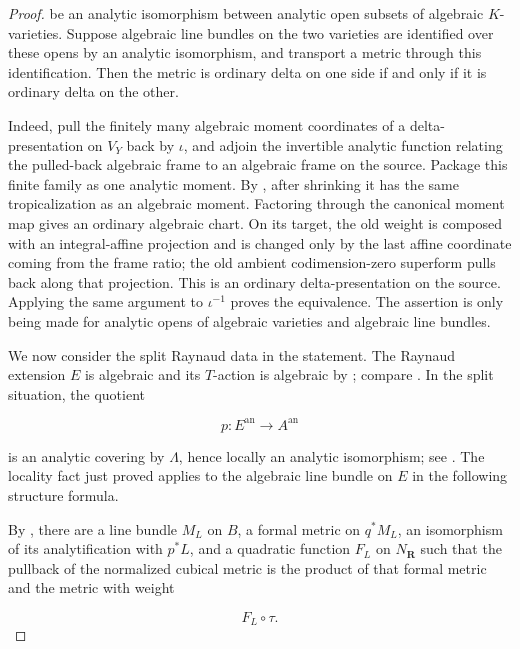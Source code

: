 \begin{proof}
be an analytic isomorphism between analytic open subsets of algebraic
\(K\)-varieties.  Suppose algebraic line bundles on the two varieties are
identified over these opens by an analytic isomorphism, and transport a
metric through this identification.  Then the metric is ordinary delta on
one side if and only if it is ordinary delta on the other.

Indeed, pull the finitely many algebraic moment coordinates of a
delta-presentation on \(V_Y\) back by \(\iota\), and adjoin the invertible
analytic function relating the pulled-back algebraic frame to an algebraic
frame on the source.  Package this finite family as one analytic moment.
By \cite[Proposition~7.2]{Gub16}, after shrinking it has the same
tropicalization as an algebraic moment.  Factoring through the canonical
moment map gives an ordinary algebraic chart.  On its target, the old
weight is composed with an integral-affine projection and is changed only
by the last affine coordinate coming from the frame ratio; the old ambient
codimension-zero superform pulls back along that projection.  This is an
ordinary delta-presentation on the source.  Applying the same argument to
\(\iota^{-1}\) proves the equivalence.  The assertion is only being made
for analytic opens of algebraic varieties and algebraic line bundles.

We now consider the split Raynaud data in the statement.  The Raynaud
extension \(E\) is algebraic and its \(T\)-action is algebraic by
\cite[\S16]{GJR26}; compare \cite[Remark~B.6.6]{CLD25}.  In the split
situation, the quotient

\[
                       p:E^{\mathrm{an}}\longrightarrow A^{\mathrm{an}}
\]

is an analytic covering by \(\Lambda\), hence locally an analytic
isomorphism; see \cite[\S19.2.1 and \S\S B.5.12--B.5.13]{CLD25}.  The
locality fact just proved applies to the algebraic line bundle on \(E\)
in the following structure formula.

By \cite[Proposition~19.2.5]{CLD25}, there are a line bundle \(M_L\) on
\(B\), a formal metric on \(q^*M_L\), an isomorphism of its analytification
with \(p^*L\), and a quadratic function \(F_L\) on \(N_{\mathbf R}\) such
that the pullback of the normalized cubical metric is the product of that
formal metric and the metric with weight

\begin{equation}
\label{eq:p09p2-raynaud-weight}
                              F_L\circ\tau.
\end{equation}


\end{proof}
